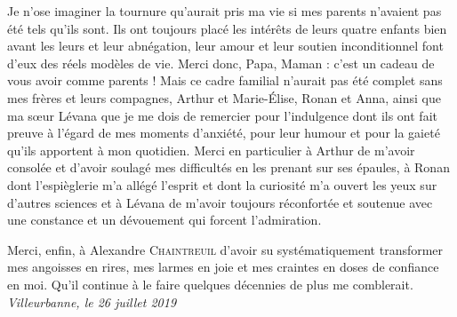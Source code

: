 Je n'ose imaginer la tournure qu'aurait pris ma vie si mes parents n'avaient pas été tels qu'ils sont.
Ils ont toujours placé les intérêts de leurs quatre enfants bien avant les leurs et leur abnégation, leur amour et leur soutien inconditionnel font d'eux des réels modèles de vie.
Merci donc, Papa, Maman : c'est un cadeau de vous avoir comme parents !
Mais ce cadre familial n'aurait pas été complet sans mes frères et leurs compagnes, Arthur et Marie-\'Elise, Ronan et Anna, ainsi que ma sœur Lévana que je me dois de remercier pour l'indulgence dont ils ont fait preuve à l'égard de mes moments d'anxiété, pour leur humour et pour la gaieté qu'ils apportent à mon quotidien.
Merci en particulier à Arthur de m'avoir consolée et d'avoir soulagé mes difficultés en les prenant sur ses épaules, à Ronan dont l'espièglerie m'a allégé l'esprit et dont la curiosité m'a ouvert les yeux sur d'autres sciences et à Lévana de m'avoir toujours réconfortée et soutenue avec une constance et un dévouement qui forcent l'admiration.

Merci, enfin, à Alexandre \textsc{Chaintreuil} d'avoir su systématiquement transformer mes angoisses en rires, mes larmes en joie et mes craintes en doses de confiance en moi. %
Qu'il continue à le faire quelques décennies de plus me comblerait.\\

\hfill \textit{Villeurbanne, le 26 juillet 2019}

%
%
%






